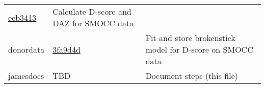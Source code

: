 \documentclass[]{book}
\begin{document}
\begin{longtable}[]{@{}lll@{}}
\begin{minipage}[t]{0.29\columnwidth}
\href{https://github.com/stefvanbuuren/donordata/commit/ecb3413b115c3193135b1af118597768b083dc41}{ecb3413}\strut
\end{minipage} & \begin{minipage}[t]{0.36\columnwidth}\raggedright
Calculate D-score and DAZ for SMOCC data\strut
\end{minipage}\tabularnewline
\begin{minipage}[t]{0.26\columnwidth}\raggedright
donordata\strut
\end{minipage} & \begin{minipage}[t]{0.29\columnwidth}\raggedright
\href{https://github.com/stefvanbuuren/donordata/commit/3fa9d4de347d09ccff32a887cf6bd8dadfdfaeb6}{3fa9d4d}\strut
\end{minipage} & \begin{minipage}[t]{0.36\columnwidth}\raggedright
Fit and store brokenstick model for D-score on SMOCC data\strut
\end{minipage}\tabularnewline
\begin{minipage}[t]{0.26\columnwidth}\raggedright
jamesdocs\strut
\end{minipage} & \begin{minipage}[t]{0.29\columnwidth}\raggedright
TBD\strut
\end{minipage} & \begin{minipage}[t]{0.36\columnwidth}\raggedright
Document steps (this file)\strut
\end{minipage}\tabularnewline
\bottomrule
\end{longtable}


\end{document}
